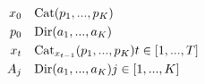 $$
\begin{align*}
x_0 &\text{ ~ Cat}(p_1, ..., p_K) \\
p_0 &\text{ ~ Dir}(a_1, ..., a_K) \\
x_t &\text{ ~ Cat}_{x_{t-1}}(p_1, ..., p_K) \space\space\space\space t \in [1, ..., T] \\
A_j &\text{ ~ Dir}(a_1, ..., a_K) \space\space\space\space j \in [1, ..., K] \\
\end{align*}
$$
